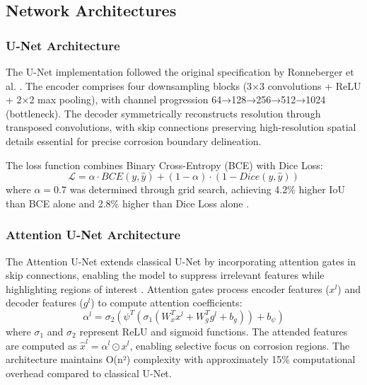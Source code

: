 \documentclass[Journal,letterpaper]{ascelike-new}
\begin{document}
\subsection{Network Architectures}
\label{subsec:architectures}

\subsubsection{U-Net Architecture}
\label{subsubsec:classical_unet}

The U-Net implementation followed the original specification by Ronneberger et al. \cite{ronneberger2015u}. The encoder comprises four downsampling blocks (3×3 convolutions + ReLU + 2×2 max pooling), with channel progression 64→128→256→512→1024 (bottleneck). The decoder symmetrically reconstructs resolution through transposed convolutions, with skip connections preserving high-resolution spatial details essential for precise corrosion boundary delineation.

The loss function combines Binary Cross-Entropy (BCE) with Dice Loss:
\begin{equation}
\mathcal{L} = \alpha \cdot BCE(y, \hat{y}) + (1-\alpha) \cdot (1 - Dice(y, \hat{y}))
\label{eq:loss_function}
\end{equation}
where $\alpha = 0.7$ was determined through grid search, achieving 4.2\% higher IoU than BCE alone and 2.8\% higher than Dice Loss alone \cite{sudre2017generalised,milletari2016v}.

\subsubsection{Attention U-Net Architecture}
\label{subsubsec:attention_unet}

The Attention U-Net extends classical U-Net by incorporating attention gates in skip connections, enabling the model to suppress irrelevant features while highlighting regions of interest \cite{oktay2018attention}. Attention gates process encoder features ($x^l$) and decoder features ($g^l$) to compute attention coefficients:
\begin{equation}
\alpha^l = \sigma_2(\psi^T(\sigma_1(W_x^T x^l + W_g^T g^l + b_g)) + b_{\psi})
\label{eq:attention_coefficients}
\end{equation}
where $\sigma_1$ and $\sigma_2$ represent ReLU and sigmoid functions. The attended features are computed as $\hat{x}^l = \alpha^l \odot x^l$, enabling selective focus on corrosion regions. The architecture maintains O(n²) complexity with approximately 15\% computational overhead compared to classical U-Net.
\end{document}
